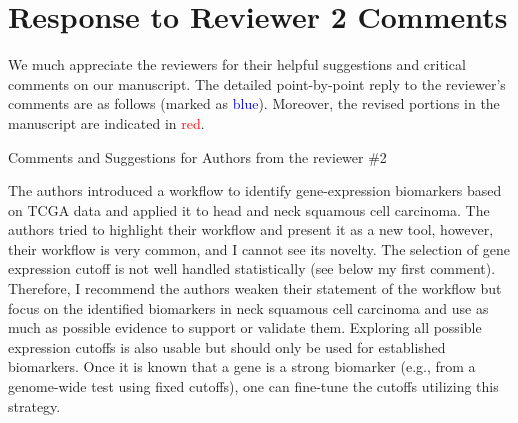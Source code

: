 \documentclass[preprint,12pt]{elsarticle}
\newenvironment{MyColorPar}[1]{%
    \leavevmode\color{#1}\ignorespaces%
}{%
}%
\begin{document}
\begin{MyColorPar}{blue}


\end{MyColorPar} %






\pagebreak


\section*{Response to Reviewer 2 Comments}
We much appreciate the reviewers for their helpful suggestions and critical comments on our manuscript. The detailed point-by-point reply to the reviewer's comments are as follows (marked as \textcolor{blue}{blue}). 
Moreover, the revised portions in the manuscript are indicated in \textcolor{red}{red}.

Comments and Suggestions for Authors from the reviewer \#2 %

The authors introduced a workflow to identify gene-expression biomarkers based on TCGA data and applied it to head and neck squamous cell carcinoma. The authors tried to highlight their workflow and present it as a new tool, however, their workflow is very common, and I cannot see its novelty. 
The selection of gene expression cutoff is not well handled statistically (see below my first comment). %
Therefore, I recommend the authors weaken their statement of the workflow but focus on the identified biomarkers in neck squamous cell carcinoma and use as much as possible evidence to support or validate them. %
Exploring all possible expression cutoffs is also usable but should only be used for established biomarkers. Once it is known that a gene is a strong biomarker (e.g., from a genome-wide test using fixed cutoffs), one can fine-tune the cutoffs utilizing this strategy. %
\end{document}
